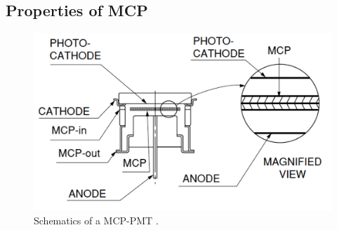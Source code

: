 \subsection{Properties of MCP}
\begin{figure}[htbp]
\begin{center}
\includegraphics[width=12cm]{../Pictures/Chapter_3/MCP_struct}
\end{center}
\caption[MCP schematics]{Schematics of a MCP-PMT \cite{Hama2006}.}
\label{fig:MCP_struct}
\end{figure}
